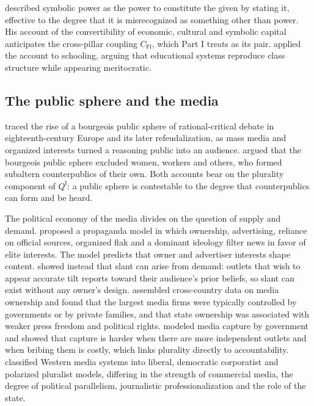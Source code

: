 \documentclass[11pt,letterpaper]{article}
\theoremstyle{definition}
\theoremstyle{remark}
\newcommand{\pF}{\mathsf{F}}
\newcommand{\pI}{\mathsf{I}}
\begin{document}
\citet{bourdieu1989,bourdieu1991} described symbolic power as the power to constitute the given by stating it, effective to the degree that it is misrecognized as something other than power. His account of the convertibility of economic, cultural and symbolic capital anticipates the cross-pillar coupling $C_{\pF\pI}$, which Part I treats as its pair. \citet{bourdieu1977} applied the account to schooling, arguing that educational systems reproduce class structure while appearing meritocratic.

\subsection{The public sphere and the media}

\citet{habermas1989} traced the rise of a bourgeois public sphere of rational-critical debate in eighteenth-century Europe and its later refeudalization, as mass media and organized interests turned a reasoning public into an audience. \citet{fraser1990} argued that the bourgeois public sphere excluded women, workers and others, who formed subaltern counterpublics of their own. Both accounts bear on the plurality component of $Q^{\pI}$: a public sphere is contestable to the degree that counterpublics can form and be heard.

The political economy of the media divides on the question of supply and demand. \citet{herman1988} proposed a propaganda model in which ownership, advertising, reliance on official sources, organized flak and a dominant ideology filter news in favor of elite interests. The model predicts that owner and advertiser interests shape content. \citet{gentzkow2006} showed instead that slant can arise from demand: outlets that wish to appear accurate tilt reports toward their audience's prior beliefs, so slant can exist without any owner's design. \citet{djankov2003} assembled cross-country data on media ownership and found that the largest media firms were typically controlled by governments or by private families, and that state ownership was associated with weaker press freedom and political rights. \citet{besley2006} modeled media capture by government and showed that capture is harder when there are more independent outlets and when bribing them is costly, which links plurality directly to accountability. \citet{hallin2004} classified Western media systems into liberal, democratic corporatist and polarized pluralist models, differing in the strength of commercial media, the degree of political parallelism, journalistic professionalization and the role of the state.
\end{document}
